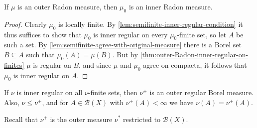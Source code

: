 \documentclass[article, a4paper, 11pt, oneside]{memoir}
\numberwithin{equation}{chapter}
\newcommand{\calB}{\mathcal{B}}
\newcommand{\borel}[1]{\calB(#1)}
\begin{document}
\begin{proposition}
    If $\mu$ is an outer Radon measure, then $\mu_0$ is an inner Radon measure.
\end{proposition}

\begin{proof}
    Clearly $\mu_0$ is locally finite. By \cref{lem:semifinite-inner-regular-condition} it thus suffices to show that $\mu_0$ is inner regular on every $\mu_0$-finite set, so let $A$ be such a set. By \cref{lem:semifinite-agree-with-original-measure} there is a Borel set $B \subseteq A$ such that $\mu_0(A) = \mu(B)$. But by \cref{thm:outer-Radon-inner-regular-on-finites} $\mu$ is regular on $B$, and since $\mu$ and $\mu_0$ agree on compacta, it follows that $\mu_0$ is inner regular on $A$.
\end{proof}





\begin{proposition}
    \label{prop:inner-regular-yields-outer-regular}
    If $\nu$ is inner regular on all $\nu$-finite sets, then $\nu^+$ is an outer regular Borel measure. Also, $\nu \leq \nu^+$, and for $A \in \borel{X}$ with $\nu^+(A) < \infty$ we have $\nu(A) = \nu^+(A)$.
\end{proposition}
%
Recall that $\nu^+$ is the outer measure $\nu^*$ restricted to $\borel{X}$.
\end{document}
